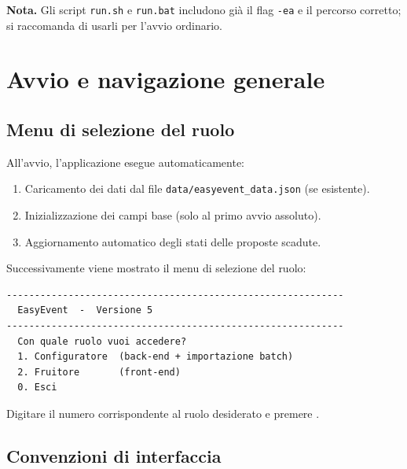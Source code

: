 \documentclass[12pt,a4paper,oneside]{report}
\newcommand{\cmd}[1]{\texttt{\small#1}}
\newcommand{\file}[1]{\texttt{\small#1}}
\newcommand{\tasto}[1]{\fbox{\small\ttfamily#1}}
\begin{document}
\begin{notabox}
\textbf{Nota.} Gli script \file{run.sh} e \file{run.bat} includono già il flag \cmd{-ea} e il percorso corretto; si raccomanda di usarli per l'avvio ordinario.
\end{notabox}

\chapter{Avvio e navigazione generale}
\label{cap:avvio}

\section{Menu di selezione del ruolo}

All'avvio, l'applicazione esegue automaticamente:
\begin{enumerate}
  \item Caricamento dei dati dal file \file{data/easyevent\_data.json} (se esistente).
  \item Inizializzazione dei campi base (solo al primo avvio assoluto).
  \item Aggiornamento automatico degli stati delle proposte scadute.
\end{enumerate}

Successivamente viene mostrato il menu di selezione del ruolo:
\begin{lstlisting}
------------------------------------------------------------
  EasyEvent  -  Versione 5
------------------------------------------------------------
  Con quale ruolo vuoi accedere?
  1. Configuratore  (back-end + importazione batch)
  2. Fruitore       (front-end)
  0. Esci
\end{lstlisting}
Digitare il numero corrispondente al ruolo desiderato e premere \tasto{INVIO}.

\section{Convenzioni di interfaccia}
\end{document}
